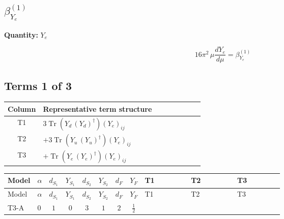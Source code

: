 \documentclass[8pt]{article}
\begin{document}
\begin{landscape}
\section*{$\beta_{Y_e}^{(1)}$}
\noindent\textbf{Quantity: }$Y_e$\par\smallskip
\[16\pi^2\,\mu\frac{d Y_e}{d\mu}=\beta_{Y_e}^{(1)}\]
\subsection*{Terms 1 of 3}
\begin{center}
\begin{tabular}{@{}c >{\raggedright\arraybackslash}p{0.82\linewidth}@{}}
\toprule
Column & Representative term structure \\
\midrule
T1 & \(\displaystyle 3 \operatorname{Tr}\!\left({Y_d}\,\left({Y_d}\right)^{\dagger}\right) \left({Y_e}\right)_{ij}\) \\
\midrule
T2 & \(\displaystyle +3 \operatorname{Tr}\!\left({Y_u}\,\left({Y_u}\right)^{\dagger}\right) \left({Y_e}\right)_{ij}\) \\
\midrule
T3 & \(\displaystyle +\operatorname{Tr}\!\left({Y_e}\,\left({Y_e}\right)^{\dagger}\right) \left({Y_e}\right)_{ij}\) \\
\midrule
\bottomrule
\end{tabular}
\end{center}
\smallskip
\tiny
\begin{longtable}{@{}llcccccc >{\raggedright\arraybackslash}p{0.21\linewidth} >{\raggedright\arraybackslash}p{0.21\linewidth} >{\raggedright\arraybackslash}p{0.21\linewidth}@{}}
\toprule
Model & $\alpha$ & $d_{S_1}$ & $Y_{S_1}$ & $d_{S_2}$ & $Y_{S_2}$ & $d_F$ & $Y_F$ & T1 & T2 & T3 \\
\midrule
\endfirsthead
\toprule
Model & $\alpha$ & $d_{S_1}$ & $Y_{S_1}$ & $d_{S_2}$ & $Y_{S_2}$ & $d_F$ & $Y_F$ & T1 & T2 & T3 \\
\midrule
\endhead
T3-A & $0$ & $1$ & $0$ & $3$ & $1$ & $2$ & $\frac{1}{2}$ & \scriptsize\adjustbox{max width=\linewidth}{$\begin{gathered} 3 \operatorname{Tr}\!\left({Y_d}\,\left({Y_d}\right)^{\dagger}\right) \left({Y_e}\right)_{ij}\end{gathered}$} & \scriptsize\adjustbox{max width=\linewidth}{$\begin{gathered} +3 \operatorname{Tr}\!\left({Y_u}\,\left({Y_u}\right)^{\dagger}\right) \left({Y_e}\right)_{ij}\end{gathered}$} & \scriptsize\adjustbox{max width=\linewidth}{$\begin{gathered} +\operatorname{Tr}\!\left({Y_e}\,\left({Y_e}\right)^{\dagger}\right) \left({Y_e}\right)_{ij}\end{gathered}$} \\

\end{longtable}
\end{landscape}
\end{document}
